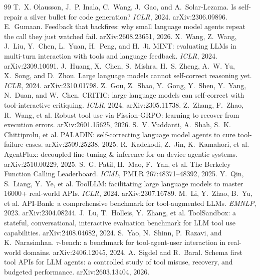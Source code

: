 \documentclass[11pt]{article}
\begin{document}
\begin{thebibliography}{99}
\small
{} T.~X. Olausson, J.~P. Inala, C.~Wang, J.~Gao, and A.~Solar-Lezama.
\newblock Is self-repair a silver bullet for code generation? \emph{ICLR}, 2024. arXiv:2306.09896.
 E.~Gumaan.
\newblock Feedback that backfires: why small language model agents repeat the call they just watched fail. arXiv:2608.23651, 2026.
 X.~Wang, Z.~Wang, J.~Liu, Y.~Chen, L.~Yuan, H.~Peng, and H.~Ji.
\newblock MINT: evaluating LLMs in multi-turn interaction with tools and language feedback. \emph{ICLR}, 2024. arXiv:2309.10691.
 J.~Huang, X.~Chen, S.~Mishra, H.~S. Zheng, A.~W. Yu, X.~Song, and D.~Zhou.
\newblock Large language models cannot self-correct reasoning yet. \emph{ICLR}, 2024. arXiv:2310.01798.
 Z.~Gou, Z.~Shao, Y.~Gong, Y.~Shen, Y.~Yang, N.~Duan, and W.~Chen.
\newblock CRITIC: large language models can self-correct with tool-interactive critiquing. \emph{ICLR}, 2024. arXiv:2305.11738.
 Z.~Zhang, F.~Zhao, R.~Wang, et al.
\newblock Robust tool use via Fission-GRPO: learning to recover from execution errors. arXiv:2601.15625, 2026.
 S.~V. Vuddanti, A.~Shah, S.~K. Chittiprolu, et al.
\newblock PALADIN: self-correcting language model agents to cure tool-failure cases. arXiv:2509.25238, 2025.
 R.~Kadekodi, Z.~Jin, K.~Kamahori, et al.
\newblock AgentFlux: decoupled fine-tuning \& inference for on-device agentic systems. arXiv:2510.00229, 2025.
 S.~G. Patil, H.~Mao, F.~Yan, et al.
\newblock The Berkeley Function Calling Leaderboard. \emph{ICML}, PMLR 267:48371--48392, 2025.
 Y.~Qin, S.~Liang, Y.~Ye, et al.
\newblock ToolLLM: facilitating large language models to master 16000+ real-world APIs. \emph{ICLR}, 2024. arXiv:2307.16789.
 M.~Li, Y.~Zhao, B.~Yu, et al.
\newblock API-Bank: a comprehensive benchmark for tool-augmented LLMs. \emph{EMNLP}, 2023. arXiv:2304.08244.
 J.~Lu, T.~Holleis, Y.~Zhang, et al.
\newblock ToolSandbox: a stateful, conversational, interactive evaluation benchmark for LLM tool use capabilities. arXiv:2408.04682, 2024.
 S.~Yao, N.~Shinn, P.~Razavi, and K.~Narasimhan.
\newblock $\tau$-bench: a benchmark for tool-agent-user interaction in real-world domains. arXiv:2406.12045, 2024.
 A.~Sigdel and R.~Baral.
\newblock Schema first tool APIs for LLM agents: a controlled study of tool misuse, recovery, and budgeted performance. arXiv:2603.13404, 2026.

\end{thebibliography}
\end{document}
